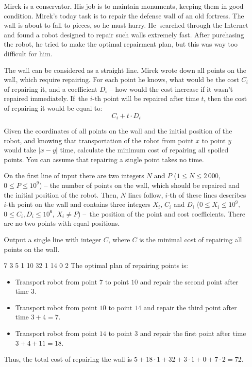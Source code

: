 





Mirek is a conservator.
His job is to maintain monuments, keeping them in good condition.
Mirek's today task is to repair the defense wall of an old fortress.
The wall is about to fall to pieces, so he must hurry.
He~searched through the Internet and found a robot designed to repair such walls extremely fast.
After purchasing the robot, he tried to make the optimal repairment plan, but this was way too difficult for him.

The wall can be considered as a straight line.
Mirek wrote down all points on the wall, which require repairing.
For each point he knows, what would be the cost $C_i$ of repairing it, and a coefficient $D_i$
	-- how would the cost increase if it wasn't repaired immediately.
If~the $i$-th point will be repaired after time $t$, then the cost of repairing it would be equal to:
\[ C_i + t \cdot D_i \]


Given the coordinates of all points on the wall and the initial position of the robot,
	and knowing that transportation of the robot from point $x$ to point $y$ would take $|x - y|$ time,
	calculate the minimum cost of repairing all spoiled points.
You can assume that repairing a single point takes no time.


On the first line of input there are two integers $N$ and $P$ ($1 \le N \le 2\,000$, $0 \le P \le 10^9$)
	-- the number of points on the wall, which should be repaired and the initial position of the robot.
Then, $N$ lines follow, $i$-th of these lines describes $i$-th point on the wall
	and contains three integers $X_i$, $C_i$ and $D_i$ ($0 \le X_i \le 10^9$, $0 \le C_i, D_i \le 10^6$, $X_i \neq P$)
	--~the position of the point and cost coefficients.
There are no two points with equal positions.


Output a single line with integer $C$, where $C$ is the minimal cost of repairing
	all points on the wall.



 7
3 5 1
10 32 1
14 0 2
\sampleCOMMENT
The optimal plan of repairing points is:
\begin{itemize}
	\item Transport robot from point $7$ to point $10$ and repair the second point after time $3$.
	\item Transport robot from point $10$ to point $14$ and repair the third point after time $3 + 4 = 7$.
	\item Transport robot from point $14$ to point $3$ and repair the first point after time $3 + 4 + 11 = 18$.
\end{itemize}
Thus, the total cost of repairing the wall is $5 + 18 \cdot 1 + 32 + 3 \cdot 1 + 0 + 7 \cdot 2 = 72$.
\sampleEND



